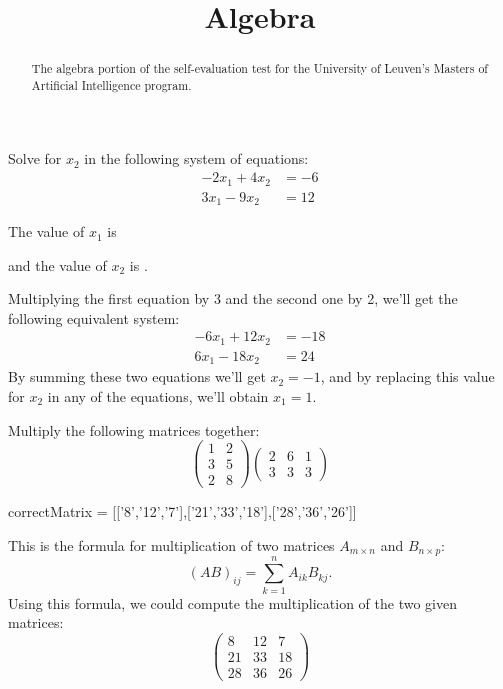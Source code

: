 \documentclass{ximera}
\title{Algebra}
\begin{document}
\begin{abstract}
The algebra portion of the self-evaluation test for the University
of Leuven's Masters of Artificial Intelligence program.
\end{abstract}
\maketitle

\begin{question}
Solve for $x_2$ in the following system of equations:
\begin{align*}
-2x_1 + 4x_2 &= -6\\
3x_1  - 9x_2 &=  12 
\end{align*}
\begin{solution}
The value of $x_1$ is 
\end{solution}
\begin{solution}
and the value of $x_2$ is .
\end{solution}
Multiplying the first equation by 3 and the second one by 2, we'll get the following equivalent system:
\begin{align*}
 -6  x_1  + 12  x_2 &= -18 \\
 6  x_1  - 18  x_2 &= 24
\end{align*}
By summing these two equations we'll get $x_2 = -1$, and by replacing
this value for $x_2$ in any of the equations, we'll obtain $x_1 = 1$.
\end{question}

\begin{question}
Multiply the following matrices together:
\[ 
\left( \begin{array}{cc}
1 & 2 \\
3 & 5 \\
2 & 8
\end{array} \right)
\left( \begin{array}{ccc}
2 & 6 & 1 \\
3 & 3 & 3
\end{array} \right)
\]
\begin{solution}
\begin{matrix-answer}[name=M]
    correctMatrix = [['8','12','7'],['21','33','18'],['28','36','26']]
\end{matrix-answer}
\end{solution}
This is the formula for multiplication of two matrices $A_{m \times n}$ and $B_{n \times p}$:
\[
    (AB)_{ij} = \sum_{k=1}^n A_{ik}B_{kj}. 
\]
Using this formula, we could compute the multiplication of the two given matrices:
\[
\begin{pmatrix}
8 & 12 & 7 \\
21 & 33 & 18 \\
28 & 36 & 26
\end{pmatrix}
\]
\end{question}
\end{document}
